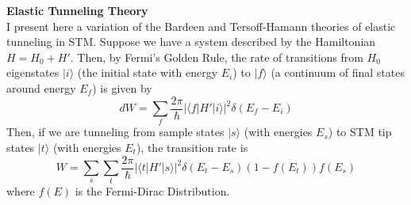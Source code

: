 \documentclass[a4paper,12pt]{article}
\begin{document}
\textbf{Elastic Tunneling Theory} \\

I present here a variation of the Bardeen and Tersoff-Hamann theories of elastic tunneling in STM.  Suppose we have a system described by the Hamiltonian $H=H_0+H'$.  Then, by Fermi's Golden Rule, the rate of transitions from $H_0$ eigenstates $| i \rangle$ (the initial state with energy $E_i$) to $| f \rangle$ (a continuum of final states around energy $E_f$) is given by
\begin{equation}
dW=\sum_f \frac{2 \pi}{\hbar} | \langle f | H' | i \rangle |^2 \delta(E_f-E_i)
\end{equation}
Then, if we are tunneling from sample states $| s \rangle$ (with energies $E_s$) to STM tip states $| t \rangle$ (with energies $E_t$), the transition rate is
\begin{equation}
W=\sum_s \sum_t \frac{2 \pi}{\hbar} | \langle t | H' | s \rangle |^2 \delta(E_t-E_s) (1-f(E_t)) f(E_s)
\end{equation}
where $f(E)$ is the Fermi-Dirac Distribution. \\
\end{document}
